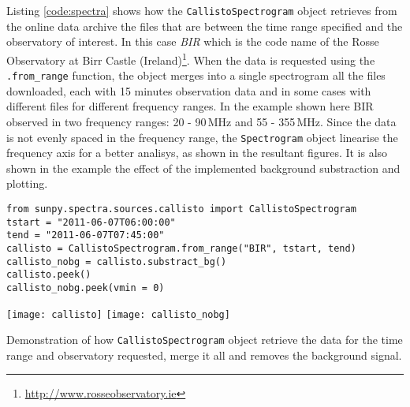 Listing \ref{code:spectra} shows how the \texttt{CallistoSpectrogram} object retrieves
from the online data archive the files that are between the time range specified and
the observatory of interest.  In this case \textit{BIR} which is the code name of the
Rosse Observatory at Birr Castle (Ireland)\footnote{\url{http://www.rosseobservatory.ie}}.
When the data is requested using the \texttt{.from\_range} function, the object merges
into a single spectrogram all the files downloaded, each with 15 minutes observation data 
and in some cases with different files for different frequency ranges.  
In the example shown here BIR observed in two frequency ranges: 20 - 90\,MHz and 55 - 355\,MHz.
Since the data is not evenly spaced in the frequency range, the \texttt{Spectrogram} object
linearise the frequency axis for a better analisys, as shown in the resultant figures.
It is also shown in the example the effect of the implemented background substraction and
plotting.

\begin{listing}[H]
\begin{verbatim}
from sunpy.spectra.sources.callisto import CallistoSpectrogram
tstart = "2011-06-07T06:00:00"
tend = "2011-06-07T07:45:00"
callisto = CallistoSpectrogram.from_range("BIR", tstart, tend)
callisto_nobg = callisto.substract_bg()
callisto.peek()
callisto_nobg.peek(vmin = 0)
\end{verbatim}
\texttt{[image: callisto]} %
\texttt{[image: callisto\_nobg]}
\caption{Demonstration of how \texttt{CallistoSpectrogram} object retrieve the data
for the time range and observatory requested, merge it all and removes the background
signal.}
\label{code:spectra}
\end{listing}


